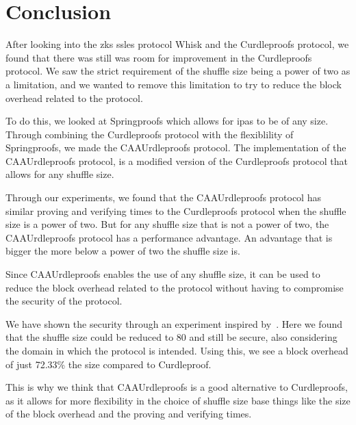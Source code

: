 

\section{Conclusion}\label{sec:conclusion}
After looking into the \glspl{zk} \glspl{ssle} protocol Whisk and the Curdleproofs protocol, we found that there was still was room for improvement in the Curdleproofs protocol.
We saw the strict requirement of the shuffle size being a power of two as a limitation, and we wanted to remove this limitation to try to reduce the block overhead related to the protocol.

To do this, we looked at Springproofs which allows for \glspl{ipa} to be of any size.
Through combining the Curdleproofs protocol with the flexiblility of Springproofs, we made the CAAUrdleproofs protocol.
The implementation of the CAAUrdleproofs protocol, is a modified version of the Curdleproofs protocol that allows for any shuffle size.

Through our experiments, we found that the CAAUrdleproofs protocol has similar proving and verifying times to the Curdleproofs protocol when the shuffle size is a power of two.
But for any shuffle size that is not a power of two, the CAAUrdleproofs protocol has a performance advantage. 
An advantage that is bigger the more below a power of two the shuffle size is.

Since CAAUrdleproofs enables the use of any shuffle size, it can be used to reduce the block overhead related to the protocol without having to compromise the security of the protocol.

We have shown the security through an experiment inspired by~\cite{cryptoeprint:2022/560}.
Here we found that the shuffle size could be reduced to 80 and still be secure, also considering the domain in which the protocol is intended.
Using this, we see a block overhead of just 72.33\% the size compared to Curdleproof.
 

This is why we think that CAAUrdleproofs is a good alternative to Curdleproofs, as it allows for more flexibility in the choice of shuffle size base things like the size of the block overhead and the proving and verifying times.
